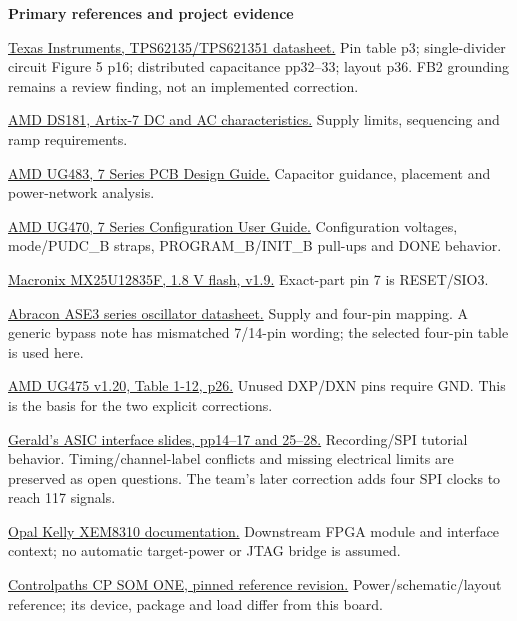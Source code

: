 \documentclass[11pt,a4paper]{article}
\begin{document}
\textbf{Primary references and project evidence}
\begingroup\small\begin{enumerate}[label={[\arabic*]},leftmargin=8mm,itemsep=4pt]
\item \href{https://www.ti.com/lit/ds/symlink/tps62135.pdf}{Texas Instruments, TPS62135/TPS621351 datasheet.} Pin table p3; single-divider circuit Figure 5 p16; distributed capacitance pp32--33; layout p36. FB2 grounding remains a review finding, not an implemented correction.
\item \href{https://docs.amd.com/api/khub/documents/iAkxxTOk96ANLJqYf2hgrQ/content}{AMD DS181, Artix-7 DC and AC characteristics.} Supply limits, sequencing and ramp requirements.
\item \href{https://docs.amd.com/api/khub/documents/6L8DUUei7ZCE78qwQafC3A/content}{AMD UG483, 7 Series PCB Design Guide.} Capacitor guidance, placement and power-network analysis.
\item \href{https://docs.amd.com/v/u/en-US/ug470_7Series_Config}{AMD UG470, 7 Series Configuration User Guide.} Configuration voltages, mode/PUDC\_B straps, PROGRAM\_B/INIT\_B pull-ups and DONE behavior.
\item \href{https://www.macronix.com/Lists/Datasheet/Attachments/8704/MX25U12835F,\%201.8V,\%20128Mb,\%20v1.9.pdf}{Macronix MX25U12835F, 1.8 V flash, v1.9.} Exact-part pin 7 is RESET/SIO3.
\item \href{https://abracon.com/Oscillators/ASE3series.pdf}{Abracon ASE3 series oscillator datasheet.} Supply and four-pin mapping. A generic bypass note has mismatched 7/14-pin wording; the selected four-pin table is used here.
\item \href{https://docs.amd.com/api/khub/documents/kHyYQ6XzXnQwR2O~gaV~MQ/content}{AMD UG475 v1.20, Table 1-12, p26.} Unused DXP/DXN pins require GND. This is the basis for the two explicit corrections.
\item \href{https://howardwhsrun.github.io/FPGA_4K/sources/slides/Chip_FPGA_Interface.pdf}{Gerald's ASIC interface slides, pp14--17 and 25--28.} Recording/SPI tutorial behavior. Timing/channel-label conflicts and missing electrical limits are preserved as open questions. The team's later correction adds four SPI clocks to reach 117 signals.
\item \href{https://docs.opalkelly.com/xem8310/}{Opal Kelly XEM8310 documentation.} Downstream FPGA module and interface context; no automatic target-power or JTAG bridge is assumed.
\item \href{https://github.com/controlpaths/cp_som_one/tree/b272899d62ac2e454f85c413d64d62271137da27}{Controlpaths CP SOM ONE, pinned reference revision.} Power/schematic/layout reference; its device, package and load differ from this board.
\end{enumerate}\endgroup
\end{document}

